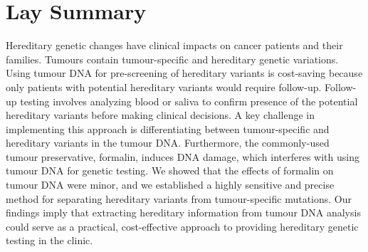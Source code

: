 
\chapter{Lay Summary}

Hereditary genetic changes have clinical impacts on cancer patients and their families. Tumours contain tumour-specific and hereditary genetic variations. Using tumour DNA for pre-screening of hereditary variants is cost-saving because only patients with potential hereditary variants would require follow-up. Follow-up testing involves analyzing blood or saliva to confirm presence of the potential hereditary variants before making clinical decisions. A key challenge in implementing this approach is differentiating between tumour-specific and hereditary variants in the tumour DNA. Furthermore, the commonly-used tumour preservative, formalin, induces DNA damage, which interferes with using tumour DNA for genetic testing. We showed that the effects of formalin on tumour DNA were minor, and we established a highly sensitive and precise method for separating hereditary variants from tumour-specific mutations. Our findings imply that extracting hereditary information from tumour DNA analysis could serve as a practical, cost-effective approach to providing hereditary genetic testing in the clinic.
